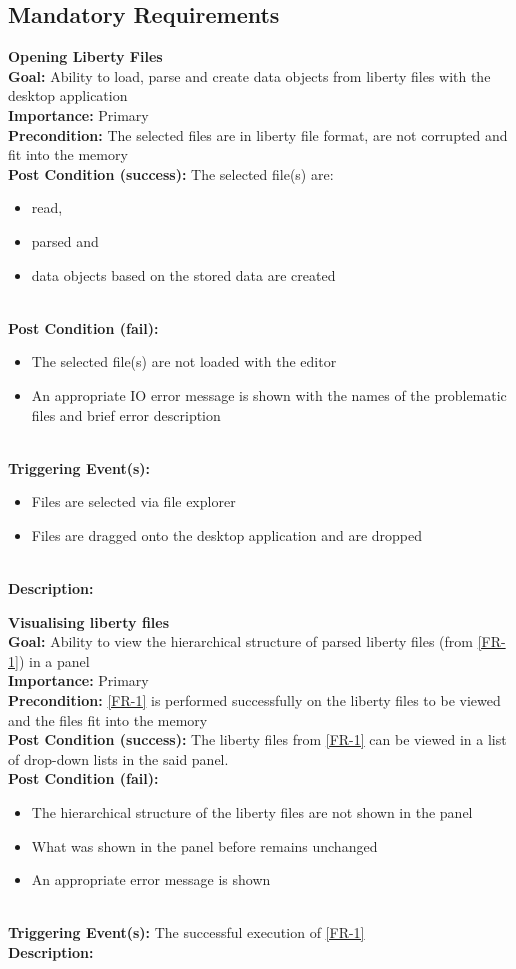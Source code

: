 \documentclass[10pt,a4paper]{report}
\newcommand{\FRDescription}[8]{
    \textbf{#1} \leavevmode \\
    \textbf{Goal: } #2 \leavevmode \\
    \textbf{Importance: } #3 \leavevmode \\
    \textbf{Precondition: } #4 \leavevmode \\
    \textbf{Post Condition (success): } #5 \leavevmode \\
    \textbf{Post Condition (fail): } #6 \leavevmode \\
    \textbf{Triggering Event(s): } #7 \leavevmode \\
    \textbf{Description: } \leavevmode \\ 
    #8}
\begin{document}
\subsection{Mandatory Requirements}
\begin{FR}

    \item \FRDescription{Opening Liberty Files}
    {Ability to load, parse and create data objects from liberty files with the desktop application}
    {Primary}
    {The selected files are in liberty file format, are not corrupted and fit into the memory}
    {The selected file(s) are:
    \begin{itemize}
        \item read,
        \item parsed and
        \item data objects based on the stored data are created
    \end{itemize}}
    {\begin{itemize}
        \item The selected file(s) are not loaded with the editor
        \item An appropriate IO error message is shown with the names of the problematic files and brief error description
    \end{itemize}}
    {\begin{itemize}
        \item Files are selected via file explorer
        \item Files are dragged onto the desktop application and are dropped
    \end{itemize}}
    \item \FRDescription{Visualising liberty files}
    {Ability to view the hierarchical structure of parsed liberty files (from \ref{FR-1}) in a panel}
    {Primary}
    {\ref{FR-1} is performed successfully on the liberty files to be viewed and the files fit into the memory}
    {The liberty files from \ref{FR-1} can be viewed in a list of drop-down lists in the said panel.}
    {\begin{itemize}
        \item The hierarchical structure of the liberty files are not shown in the panel
        \item What was shown in the panel before remains unchanged
        \item An appropriate error message is shown
    \end{itemize}}
    {The successful execution of \ref{FR-1}}
    \item {}

\end{FR}
\end{document}
